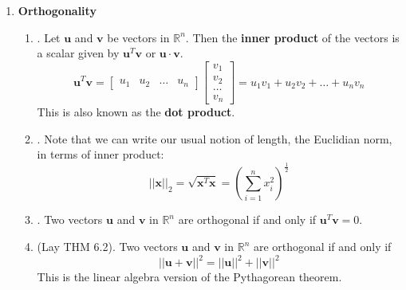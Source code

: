 \documentclass[12pt]{article}
\begin{document}
\begin{enumerate}
\begin{enumerate}
	\end{enumerate}

\item\textbf{Orthogonality}
	\begin{enumerate}
	\item\underline{}.
		Let $\mathbf{u}$ and $\mathbf{v}$ be vectors in $\mathbb{R}^n$. Then the \textbf{inner product} of the vectors is
		a scalar given by $\mathbf{u}^T\mathbf{v}$ or $\mathbf{u}\cdot\mathbf{v}$.
			\[\mathbf{u}^T\mathbf{v}=\begin{bmatrix}u_1&u_2&\dots&u_n\end{bmatrix}\begin{bmatrix}v_1\\v_2\\\dots\\v_n\end{bmatrix}
			=u_1v_1+u_2v_2+\dots+u_nv_n\]
		This is also known as the \textbf{dot product}.

	\item\underline{}.
		Note that we can write our usual notion of length, the Euclidian norm, in terms of inner product:
			\[||\mathbf{x}||_2=\sqrt{\mathbf{x}^T\mathbf{x}}=\left(\sum_{i=1}^nx_i^2\right)^{\frac{1}{2}}\]

	\item\underline{}.
		Two vectors $\mathbf{u}$ and $\mathbf{v}$ in $\mathbb{R}^n$ are orthogonal if and only if
		$\mathbf{u}^T\mathbf{v}=0$.

	\item\underline{} (Lay THM 6.2).
		Two vectors $\mathbf{u}$ and $\mathbf{v}$ in $\mathbb{R}^n$ are orthogonal if and only if
			\[||\mathbf{u}+\mathbf{v}||^2 = ||\mathbf{u}||^2+||\mathbf{v}||^2\]
		This is the linear algebra version of the Pythagorean theorem.
	

\end{enumerate}
\end{enumerate}
\end{document}
